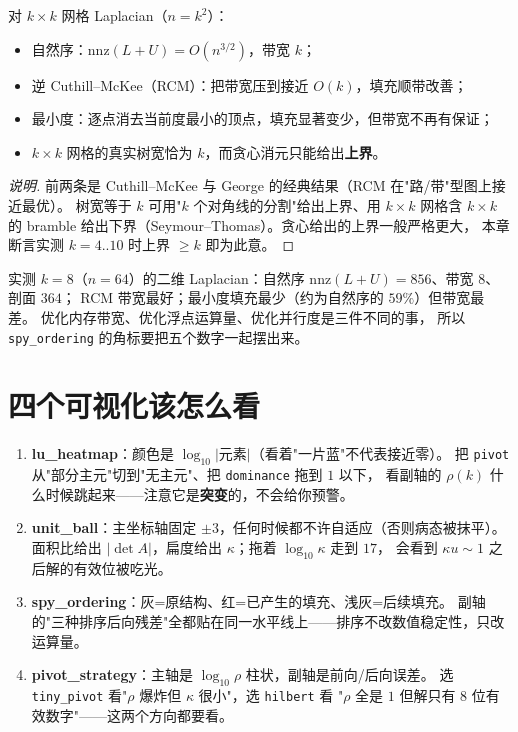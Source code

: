 \begin{theorem}
\label{thm:ordering}
对 $k\times k$ 网格 Laplacian（$n=k^2$）：
\begin{itemize}
  \item 自然序：$\mathrm{nnz}(L+U)=O(n^{3/2})$，带宽 $k$；
  \item 逆 Cuthill--McKee（RCM）：把带宽压到接近 $O(k)$，填充顺带改善；
  \item 最小度：逐点消去当前度最小的顶点，填充显著变少，但带宽不再有保证；
  \item $k\times k$ 网格的真实树宽恰为 $k$，而贪心消元只能给出\textbf{上界}。
\end{itemize}
\end{theorem}

\begin{proof}[说明]
前两条是 Cuthill--McKee 与 George 的经典结果（RCM 在"路/带"型图上接近最优）。
树宽等于 $k$ 可用"$k$ 个对角线的分割"给出上界、用 $k\times k$ 网格含
$k\times k$ 的 bramble 给出下界（Seymour--Thomas）。贪心给出的上界一般严格更大，
本章断言实测 $k=4..10$ 时上界 $\ge k$ 即为此意。
\end{proof}

\begin{remark}[三个目标互相打架]
实测 $k=8$（$n=64$）的二维 Laplacian：自然序 $\mathrm{nnz}(L+U)=856$、带宽 $8$、剖面 $364$；
RCM 带宽最好；最小度填充最少（约为自然序的 $59\%$）但带宽最差。
优化内存带宽、优化浮点运算量、优化并行度是三件不同的事，
所以 \texttt{spy\_\allowbreak{}ordering} 的角标要把五个数字一起摆出来。
\end{remark}

\section{四个可视化该怎么看}

\begin{enumerate}
  \item \textbf{lu\_heatmap}：颜色是 $\log_{10}|$元素$|$（看着"一片蓝"不代表接近零）。
        把 \texttt{pivot} 从"部分主元"切到"无主元"、把 \texttt{dominance} 拖到 $1$ 以下，
        看副轴的 $\rho(k)$ 什么时候跳起来——注意它是\textbf{突变}的，不会给你预警。
  \item \textbf{unit\_ball}：主坐标轴固定 $\pm3$，任何时候都不许自适应（否则病态被抹平）。
        面积比给出 $|\det A|$，扁度给出 $\kappa$；拖着 $\log_{10}\kappa$ 走到 $17$，
        会看到 $\kappa u\sim1$ 之后解的有效位被吃光。
  \item \textbf{spy\_ordering}：灰=原结构、红=已产生的填充、浅灰=后续填充。
        副轴的"三种排序后向残差"全都贴在同一水平线上——排序不改数值稳定性，只改运算量。
  \item \textbf{pivot\_strategy}：主轴是 $\log_{10}\rho$ 柱状，副轴是前向/后向误差。
        选 \texttt{tiny\_\allowbreak{}pivot} 看"$\rho$ 爆炸但 $\kappa$ 很小"，选 \texttt{hilbert} 看
        "$\rho$ 全是 $1$ 但解只有 8 位有效数字"——这两个方向都要看。
\end{enumerate}

